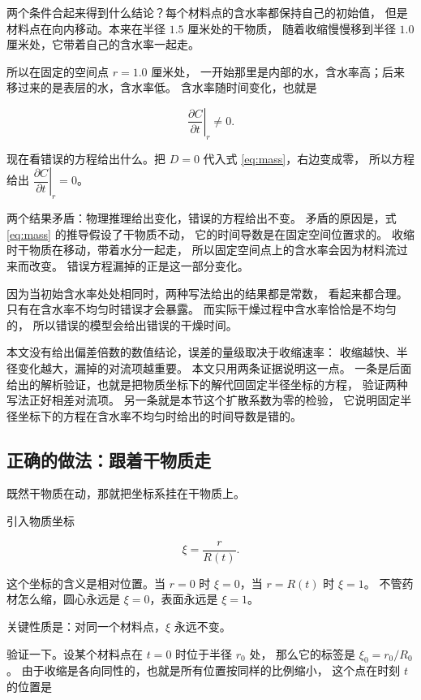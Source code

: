 两个条件合起来得到什么结论？每个材料点的含水率都保持自己的初始值，
但是材料点在向内移动。本来在半径 $1.5$ 厘米处的干物质，
随着收缩慢慢移到半径 $1.0$ 厘米处，它带着自己的含水率一起走。

所以在固定的空间点 $r=1.0$ 厘米处，
一开始那里是内部的水，含水率高；后来移过来的是表层的水，含水率低。
含水率随时间变化，也就是

\begin{equation}
\left.\frac{\partial C}{\partial t}\right|_r \ne 0 .
\end{equation}

现在看错误的方程给出什么。把 $D=0$ 代入式 \eqref{eq:mass}，右边变成零，
所以方程给出 $\left.\dfrac{\partial C}{\partial t}\right|_r=0$。

两个结果矛盾：物理推理给出变化，错误的方程给出不变。
矛盾的原因是，式 \eqref{eq:mass} 的推导假设了干物质不动，
它的时间导数是在固定空间位置求的。
收缩时干物质在移动，带着水分一起走，
所以固定空间点上的含水率会因为材料流过来而改变。
错误方程漏掉的正是这一部分变化。

因为当初始含水率处处相同时，两种写法给出的结果都是常数，
看起来都合理。
只有在含水率不均匀时错误才会暴露。
而实际干燥过程中含水率恰恰是不均匀的，
所以错误的模型会给出错误的干燥时间。

本文没有给出偏差倍数的数值结论，误差的量级取决于收缩速率：
收缩越快、半径变化越大，漏掉的对流项越重要。
本文只用两条证据说明这一点。
一条是后面给出的解析验证，也就是把物质坐标下的解代回固定半径坐标的方程，
验证两种写法正好相差对流项。
另一条就是本节这个扩散系数为零的检验，
它说明固定半径坐标下的方程在含水率不均匀时给出的时间导数是错的。

\subsection{正确的做法：跟着干物质走}

既然干物质在动，那就把坐标系挂在干物质上。

引入物质坐标

\begin{equation}
\xi = \frac{r}{R(t)} .
\end{equation}

这个坐标的含义是相对位置。当 $r=0$ 时 $\xi=0$，当 $r=R(t)$ 时 $\xi=1$。
不管药材怎么缩，圆心永远是 $\xi=0$，表面永远是 $\xi=1$。

关键性质是：对同一个材料点，$\xi$ 永远不变。

验证一下。设某个材料点在 $t=0$ 时位于半径 $r_0$ 处，
那么它的标签是 $\xi_0=r_0/R_0$。
由于收缩是各向同性的，也就是所有位置按同样的比例缩小，
这个点在时刻 $t$ 的位置是

